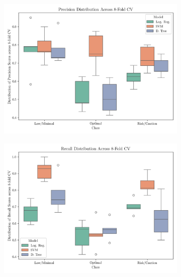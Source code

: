 \documentclass[conference]{IEEEtran}
\begin{document}
\begin{figure}[H]
    \centering
    \begin{subfigure}[1]{\linewidth}
        \centering
        \includegraphics[width=.95\linewidth]{assets/box_precision.png}
        \caption{ }
        \label{box_precision}
    \end{subfigure}
    
    \vspace{0.05cm}

    \begin{subfigure}[1]{\linewidth}
        \centering
        \includegraphics[width=.95\linewidth]{assets/box_recall.png}
        \caption{ }
        \label{box_recall}
    \end{subfigure}
\end{figure}
\end{document}
